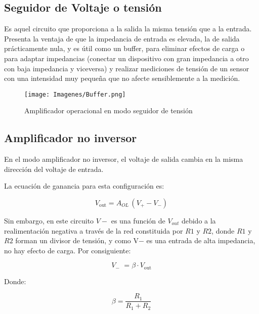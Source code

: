 \documentclass{article}
\begin{document}
\subsection{Seguidor de Voltaje o tensión}

Es aquel circuito que proporciona a la salida la misma tensión que a la entrada. Presenta la ventaja de que la impedancia de entrada es elevada, la de salida prácticamente nula, y es útil como un buffer, para eliminar efectos de carga o para adaptar impedancias (conectar un dispositivo con gran impedancia a otro con baja impedancia y viceversa) y realizar mediciones de tensión de un sensor con una intensidad muy pequeña que no afecte sensiblemente a la medición.\citep{AmplificadorOperacional}

\begin{figure}[h!]
    \centering
    \texttt{[image: Imagenes/Buffer.png]}
    \caption{Amplificador operacional en modo seguidor de tensión \citep{AmplificadorOperacional}}
    \label{fig:buffer}
\end{figure}

\subsection{Amplificador no inversor}

En el modo amplificador no inversor, el voltaje de salida cambia en la misma dirección del voltaje de entrada.\citep{AmplificadorOperacional}

La ecuación de ganancia para esta configuración es:

\begin{equation}
    {\displaystyle V_{\text{out}}=A_{OL}\,(V_{\!+}-V_{\!-})} 
\end{equation}

Sin embargo, en este circuito $V−$ es una función de $V_{out}$ debido a la realimentación negativa a través de la red constituida por $R1$ y $R2$, donde $R1$ y 
$R2$ forman un divisor de tensión, y como V− es una entrada de alta impedancia, no hay efecto de carga. Por consiguiente:

\begin{equation}
    {\displaystyle V_{\!-}\,\,=\beta \cdot V_{\text{out}}} 
\end{equation}


Donde:

\begin{equation}
{\displaystyle \beta ={\frac {R_{1}}{R_{1}+R_{2}}}}
\end{equation}
\end{document}
